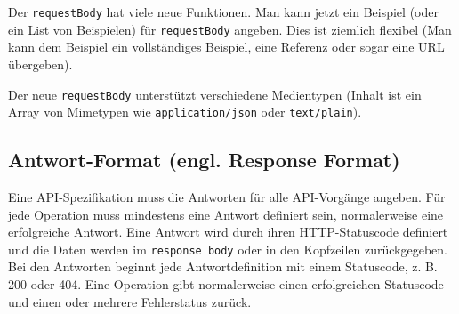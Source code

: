 Der \texttt{requestBody} hat viele neue Funktionen. Man kann jetzt ein Beispiel (oder ein List von Beispielen) für \texttt{requestBody} angeben. Dies ist ziemlich flexibel (Man kann dem Beispiel ein vollständiges Beispiel, eine Referenz oder sogar eine URL übergeben).

Der neue \texttt{requestBody} unterstützt verschiedene Medientypen (Inhalt ist ein Array von Mimetypen wie \texttt{application/json} oder \texttt{text/plain}).

\subsection{Antwort-Format (engl. Response Format)}

Eine API-Spezifikation muss die Antworten für alle API-Vorgänge angeben. Für jede Operation muss mindestens eine Antwort definiert sein, normalerweise eine erfolgreiche Antwort. Eine Antwort wird durch ihren HTTP-Statuscode definiert und die Daten werden im \texttt{response body} oder in den Kopfzeilen zurückgegeben. Bei den Antworten beginnt jede Antwortdefinition mit einem Statuscode, z. B. 200 oder 404. Eine Operation gibt normalerweise einen erfolgreichen Statuscode und einen oder mehrere Fehlerstatus zurück\cite{openapirequestbody17}.


 


























